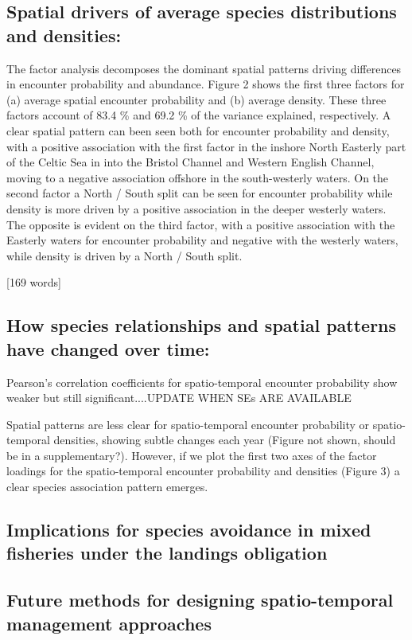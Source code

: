 \documentclass{nature}
\begin{document}
\begin{linenumbers}
[210 words]

\subsection{Spatial drivers of average species distributions and densities:}
The factor analysis decomposes the dominant spatial patterns driving
differences in encounter probability and abundance. Figure 2 shows
the first three factors for (a) average spatial encounter probability and (b)
average density. These three factors account of 83.4 \% and 69.2 \% of the
variance explained, respectively. A clear spatial pattern can been seen both
for encounter probability and density, with a positive association with the
first factor in the inshore North Easterly part of the Celtic Sea in into the
Bristol Channel and Western English Channel, moving to a negative association
offshore in the south-westerly waters. On the second factor a North / South
split can be seen for encounter probability while density is more driven by a
positive association in the deeper westerly waters. The opposite is evident on
the third factor, with a positive association with the Easterly waters for
encounter probability and negative with the westerly waters, while density is
driven by a North / South split.

[169 words]

\subsection{How species relationships and spatial patterns have changed over
	time:}
Pearson's correlation coefficients for spatio-temporal encounter probability
show weaker but still significant....UPDATE WHEN SEs ARE AVAILABLE

Spatial patterns are less clear for spatio-temporal encounter probability or
spatio-temporal densities, showing subtle changes each year (Figure not shown,
should be in a supplementary?). However, if we plot the first two axes of the
factor loadings for the spatio-temporal encounter probability and densities
(Figure 3) a clear species association pattern emerges. 

\subsection{Implications for species avoidance in mixed fisheries under the
	landings obligation}

\subsection{Future methods for designing spatio-temporal management approaches}


\end{linenumbers}
\end{document}
